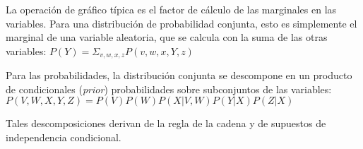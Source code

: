 La operación de gráfico t\'{i}pica es el factor de
c\'{a}lculo de las marginales en las variables. Para una 
distribución de probabilidad conjunta, esto es simplemente el marginal de una
variable aleatoria, que se calcula con la suma de las otras 
variables: $P(Y)= \Sigma_{v,w,x,z}P(v,w,x,Y,z)$

Para las probabilidades,
la distribuci\'{o}n conjunta se descompone en un producto de
condicionales (\emph{prior}) probabilidades sobre subconjuntos de las
variables: $P(V,W,X,Y,Z)=P(V)P(W)P(X|V,W)P(Y|X)P(Z|X)$

Tales descomposiciones derivan de la regla de la cadena y de supuestos de independencia condicional.
